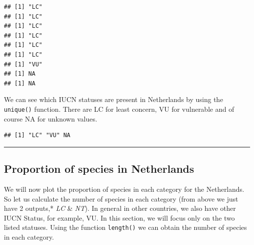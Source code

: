 \documentclass[
]{book}
\newenvironment{Shaded}{\begin{snugshade}}{\end{snugshade}}
\newcommand{\CommentTok}[1]{\textcolor[rgb]{0.56,0.35,0.01}{\textit{#1}}}
\newcommand{\KeywordTok}[1]{\textcolor[rgb]{0.13,0.29,0.53}{\textbf{#1}}}
\newcommand{\NormalTok}[1]{#1}
\newcommand{\OperatorTok}[1]{\textcolor[rgb]{0.81,0.36,0.00}{\textbf{#1}}}
\newcommand{\StringTok}[1]{\textcolor[rgb]{0.31,0.60,0.02}{#1}}
\begin{document}
\begin{verbatim}
## [1] "LC"
## [1] "LC"
## [1] "LC"
## [1] "LC"
## [1] "LC"
## [1] "LC"
## [1] "VU"
## [1] NA
## [1] NA
\end{verbatim}

We can see which IUCN statuses are present in Netherlands by using the \texttt{unique()} function. There are LC for least concern, VU for vulnerable and of course NA for unknown values.

\begin{Shaded}
\end{Shaded}

\begin{verbatim}
## [1] "LC" "VU" NA
\end{verbatim}

\begin{center}\rule{0.5\linewidth}{0.5pt}\end{center}

\hypertarget{proportion-of-species-in-netherlands}{%
\subsection{Proportion of species in Netherlands}\label{proportion-of-species-in-netherlands}}

We will now plot the proportion of species in each category for the Netherlands. So let us calculate the number of species in each category (from above we just have 2 outputs,* \emph{LC} \& \emph{NT}). In general in other countries, we also have other IUCN Status, for example, VU. In this section, we will focus only on the two listed statuses. Using the function \texttt{length()} we can obtain the number of species in each category.

\begin{Shaded}
\end{Shaded}
\end{document}
